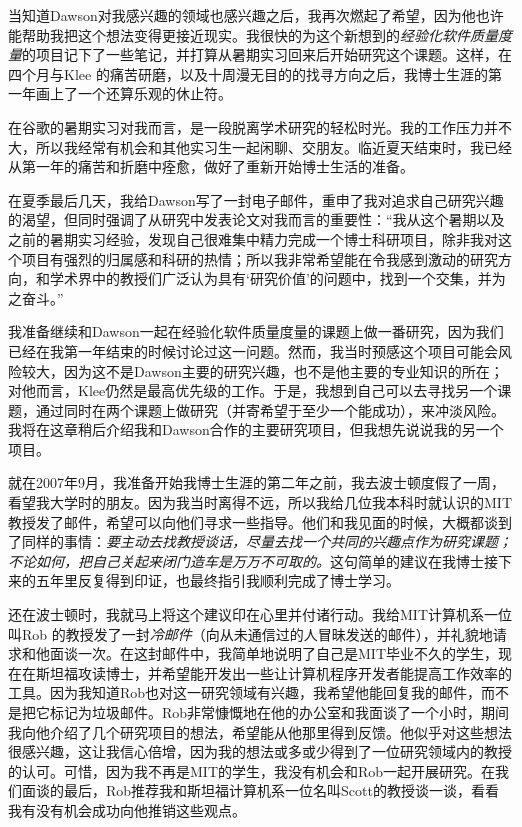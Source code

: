\documentclass[12pt,UTF8,nofonts]{book}
\begin{document}
当知道Dawson对我感兴趣的领域也感兴趣之后，我再次燃起了希望，因为他也许能帮助我把这个想法变得更接近现实。我很快的为这个新想到的\emph{经验化软件质量度量}的项目记下了一些笔记，并打算从暑期实习回来后开始研究这个课题。这样，在四个月与Klee 的痛苦研磨，以及十周漫无目的的找寻方向之后，我博士生涯的第一年画上了一个还算乐观的休止符。


在谷歌的暑期实习对我而言，是一段脱离学术研究的轻松时光。我的工作压力并不大，所以我经常有机会和其他实习生一起闲聊、交朋友。临近夏天结束时，我已经从第一年的痛苦和折磨中痊愈，做好了重新开始博士生活的准备。

在夏季最后几天，我给Dawson写了一封电子邮件，重申了我对追求自己研究兴趣的渴望，但同时强调了从研究中发表论文对我而言的重要性：“我从这个暑期以及之前的暑期实习经验，发现自己很难集中精力完成一个博士科研项目，除非我对这个项目有强烈的归属感和科研的热情；所以我非常希望能在令我感到激动的研究方向，和学术界中的教授们广泛认为具有‘研究价值’的问题中，找到一个交集，并为之奋斗。”

我准备继续和Dawson一起在经验化软件质量度量的课题上做一番研究，因为我们已经在我第一年结束的时候讨论过这一问题。然而，我当时预感这个项目可能会风险较大，因为这不是Dawson主要的研究兴趣，也不是他主要的专业知识的所在；对他而言，Klee仍然是最高优先级的工作。于是，我想到自己可以去寻找另一个课题，通过同时在两个课题上做研究（并寄希望于至少一个能成功），来冲淡风险。我将在这章稍后介绍我和Dawson合作的主要研究项目，但我想先说说我的另一个项目。

\breakline

就在2007年9月，我准备开始我博士生涯的第二年之前，我去波士顿度假了一周，看望我大学时的朋友。因为我当时离得不远，所以我给几位我本科时就认识的MIT教授发了邮件，希望可以向他们寻求一些指导。他们和我见面的时候，大概都谈到了同样的事情：\emph{要主动去找教授谈话，尽量去找一个共同的兴趣点作为研究课题；不论如何，把自己关起来闭门造车是万万不可取的。}这句简单的建议在我博士接下来的五年里反复得到印证，也最终指引我顺利完成了博士学习。

还在波士顿时，我就马上将这个建议印在心里并付诸行动。我给MIT计算机系一位叫Rob 的教授发了一封\emph{冷邮件}（向从未通信过的人冒昧发送的邮件），并礼貌地请求和他面谈一次。在这封邮件中，我简单地说明了自己是MIT毕业不久的学生，现在在斯坦福攻读博士，并希望能开发出一些让计算机程序开发者能提高工作效率的工具。因为我知道Rob也对这一研究领域有兴趣，我希望他能回复我的邮件，而不是把它标记为垃圾邮件。Rob非常慷慨地在他的办公室和我面谈了一个小时，期间我向他介绍了几个研究项目的想法，希望能从他那里得到反馈。他似乎对这些想法很感兴趣，这让我信心倍增，因为我的想法或多或少得到了一位研究领域内的教授的认可。可惜，因为我不再是MIT的学生，我没有机会和Rob一起开展研究。在我们面谈的最后，Rob推荐我和斯坦福计算机系一位名叫Scott的教授谈一谈，看看我有没有机会成功向他推销这些观点。
\end{document}
